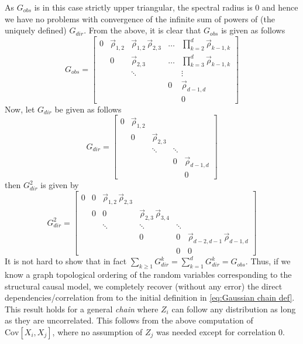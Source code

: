 \documentclass[../Thesis.tex]{subfiles}
\begin{document}
As $G_{obs}$ is in this case strictly upper triangular, the spectral radius is $0$ and hence we have no problems with convergence of the infinite sum of powers of (the uniquely defined) $G_{dir}$. From the above, it is clear that $G_{obs}$ is given as follows
\begin{equation}\label{eq:Gaussian chain G_obs triangular form}
    G_{obs} = \begin{bmatrix}
        0 & \vec{\rho}_{1,2} & \vec{\rho}_{1,2}\,\vec{\rho}_{2,3} & \dots & \prod_{k=2}^{d} \vec{\rho}_{k-1,k} \\
          & 0          & \vec{\rho}_{2,3}             & \dots & \prod_{k=3}^{d} \vec{\rho}_{k-1,k} \\
          &            & \ddots                 &       & \vdots                       \\
          &            &                        & 0     & \vec{\rho}_{d-1,d}                 \\
          &            &                        &       & 0
    \end{bmatrix}
\end{equation}
Now, let $G_{dir}$ be given as follows
$$G_{dir} = \begin{bmatrix}
        0 & \vec{\rho}_{1,2} &            &        &              \\
          & 0          & \vec{\rho}_{2,3} &        &              \\
          &            & \ddots     & \ddots &              \\
          &            &            & 0      & \vec{\rho}_{d-1,d} \\
          &            &            &        & 0
    \end{bmatrix}$$
then $G_{dir}^2$ is given by
$$G_{dir}^2 = \begin{bmatrix}
        0 & 0 & \vec{\rho}_{1,2}   \, \vec{\rho}_{2,3} &                          &        &                               \\
          & 0 & 0                          & \vec{\rho}_{2,3} \, \vec{\rho}_{3,4} &        &                               \\
          &   & \ddots                     & \ddots                   & \ddots &                               \\
          &   &                            & 0                        & 0      & \vec{\rho}_{d-2,d-1}\, \vec{\rho}_{d-1,d} \\
          &   &                            &                          & 0      & 0
    \end{bmatrix}$$
It is not hard to show that in fact $\sum_{k\geq 1} G_{dir}^k = \sum_{k=1}^d G_{dir}^k = G_{obs}$. Thus, if we know a graph topological ordering of the random variables corresponding to the structural causal model, we completely recover (without any error) the direct dependencies/correlation from to the initial definition in \autoref{eq:Gaussian chain def}. This result holds for a general \textit{chain} where $Z_i$ can follow any distribution as long as they are uncorrelated. This follows from the above computation of $\text{Cov}\left[X_i,X_j\right]$, where no assumption of $Z_j$ was needed except for correlation $0$.
\end{document}
